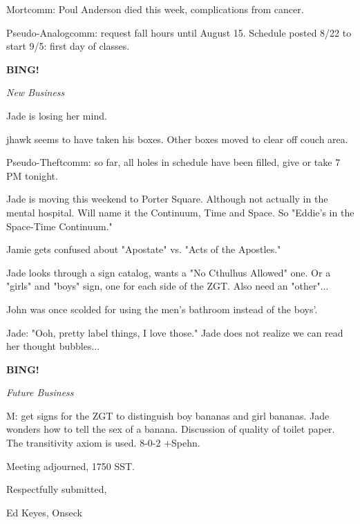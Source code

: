 \documentclass[12pt]{article}
\newcommand{\bing}{{\bf BING!} }
\newcommand{\goto}[1]{\bing \vskip 12pt \centerline{{\em{#1}}}}
\begin{document}
Mortcomm: Poul Anderson died this week, complications from cancer.

Pseudo-Analogcomm: request fall hours until August 15. Schedule posted 8/22 to start 9/5: first day of classes.

\goto{New Business}

Jade is losing her mind.

jhawk seems to have taken his boxes. Other boxes moved to clear off couch area.

Pseudo-Theftcomm: so far, all holes in schedule have been filled, give or take 7 PM tonight.

Jade is moving this weekend to Porter Square. Although not actually in the mental hospital. Will name it the Continuum, Time and Space. So "Eddie's in the Space-Time Continuum."

Jamie gets confused about "Apostate" vs. "Acts of the Apostles."

Jade looks through a sign catalog, wants a "No Cthulhus Allowed" one. Or a "girls" and "boys" sign, one for each side of the ZGT. Also need an "other"...

John was once scolded for using the men's bathroom instead of the boys'.

Jade: "Ooh, pretty label things, I love those." Jade does not realize we can read her thought bubbles...

\goto{Future Business}

M: get signs for the ZGT to distinguish boy bananas and girl bananas. Jade wonders how to tell the sex of a banana. Discussion of quality of toilet paper. The transitivity axiom is used. 8-0-2 +Spehn.

\vspace{12pt}

\noindent
Meeting adjourned, 1750 SST.

\vspace{18pt}

\centerline{Respectfully submitted,}
\centerline{Ed Keyes, Onseck}
\end{document}
